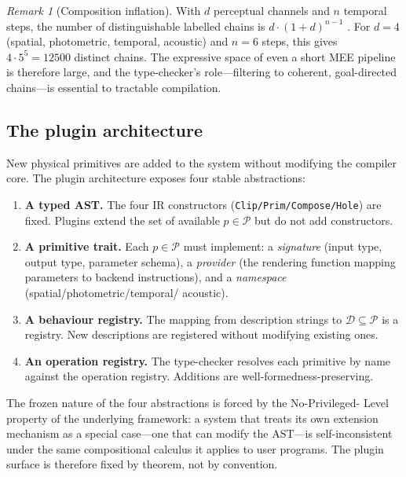 \documentclass[twocolumn,11pt,a4paper]{article}
\theoremstyle{mee}
\theoremstyle{definition}
\theoremstyle{remark}
\newtheorem{remark}[theorem]{Remark}
\newcommand{\Desc}{\mathcal{D}}
\newcommand{\Phys}{\mathcal{P}}
\begin{document}
\begin{remark}[Composition inflation]
\label{rem:inflation}
With $d$ perceptual channels and $n$ temporal steps, the number of
distinguishable labelled chains is $d\cdot(1+d)^{n-1}$
\citep{kolmogorov1965}. For $d=4$ (spatial, photometric, temporal,
acoustic) and $n=6$ steps, this gives $4\cdot5^5=12500$ distinct chains.
The expressive space of even a short MEE pipeline is therefore large, and
the type-checker's role---filtering to coherent, goal-directed chains---is
essential to tractable compilation.
\end{remark}

\subsection{The plugin architecture}

New physical primitives are added to the system without modifying the
compiler core. The plugin architecture exposes four stable abstractions:

\begin{enumerate}[leftmargin=1.4em,itemsep=2pt]
\item \textbf{A typed AST.} The four IR constructors
  (\texttt{Clip/Prim/Compose/Hole}) are fixed. Plugins extend the set of
  available $p\in\Phys$ but do not add constructors.
\item \textbf{A primitive trait.} Each $p\in\Phys$ must implement:
  a \emph{signature} (input type, output type, parameter schema), a
  \emph{provider} (the rendering function mapping parameters to backend
  instructions), and a \emph{namespace} (spatial/photometric/temporal/
  acoustic).
\item \textbf{A behaviour registry.} The mapping from description strings
  to $\Desc\subseteq\Phys$ is a registry. New descriptions are registered
  without modifying existing ones.
\item \textbf{An operation registry.} The type-checker resolves each
  primitive by name against the operation registry. Additions are
  well-formedness-preserving.
\end{enumerate}

The frozen nature of the four abstractions is forced by the No-Privileged-
Level property of the underlying framework: a system that treats its own
extension mechanism as a special case---one that can modify the AST---is
self-inconsistent under the same compositional calculus it applies to
user programs. The plugin surface is therefore fixed by theorem, not by
convention.
\end{document}
